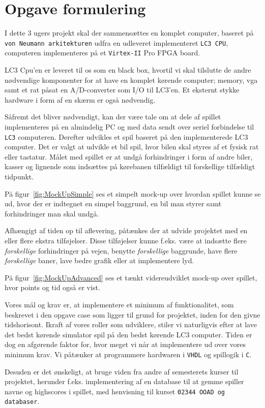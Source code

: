 \chapter{Opgave formulering}
I dette 3 ugers projekt skal der sammensættes en komplet computer, baseret på \texttt{von Neumann arkitekturen} udfra en udleveret implementeret \texttt{LC3 CPU}, computeren implementeres på et \texttt{Virtex-II} Pro FPGA board.

LC3 Cpu’en er leveret til os som en black box, hvortil vi skal tilslutte de andre nødvendige komponenter for at have en komplet kørende computer; memory, vga samt et rat påsat en A/D-converter som I/O til LC3’en. Et eksternt stykke hardware i form af en skærm er også nødvendig.

Såfremt det bliver nødvendigt, kan der være tale om at dele af spillet implementeres på en almindelig PC og med data sendt over seriel forbindelse til \texttt{LC3} computeren. 
Derefter udvikles et spil baseret på den implementerede LC3 computer. Det er valgt at udvikle et bil spil, hvor bilen skal styres af et fysisk rat eller tastatur. Målet med spillet er at undgå forhindringer i form af andre biler, kasser og lignende som indsættes på kørebanen tilfældigt til forskellige tilfældigt tidpunkt.

På figur~\vref{fig:MockUpSimple} ses et simpelt mock-up over hvordan spillet kunne se ud, hvor der er indtegnet en simpel baggrund, en bil man styrer samt forhindringer man skal undgå.


Afhængigt af tiden op til aflevering, påtænkes der at udvide projektet med en eller flere ekstra tilføjelser. Disse tilføjelser kunne f.eks. være at indsætte flere \textit{forskellige} forhindringer på vejen, benytte \textit{forskellige} baggrunde, have flere \textit{forskellige} baner, lave bedre grafik eller at implementere lyd.

På figur~\vref{fig:MockUpAdvanced} ses et tænkt videreudviklet mock-up over spillet, hvor points og tid også er vist.


Vores mål og krav er, at implementere et minimum af funktionalitet, som beskrevet i den opgave case som ligger til grund for projektet, inden for den givne tidshorisont. Ikraft af vores roller som udviklere, stiler vi naturligvis efter at lave det bedst kørende simulator spil på den bedst kørende LC3 computer. Tiden er dog en afgørende faktor for, hvor meget vi når at implementere ud over vores minimum krav.
Vi påtænker at programmere hardwaren i \texttt{VHDL} og spillogik i \texttt{C}.

Desuden er det ønskeligt, at bruge viden fra andre af semesterets kurser til projektet, herunder f.eks. implementering af en database til at gemme spiller navne og highscores i spillet, med henvisning til kurset \texttt{02344 OOAD og databaser}.

